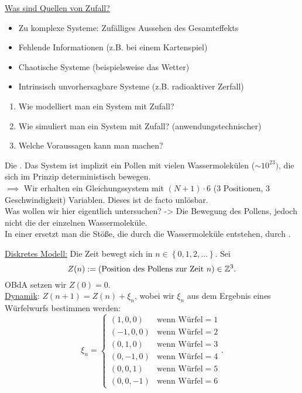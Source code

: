\underline{Was sind Quellen von Zufall?}
\begin{itemize}
    \item Zu komplexe Systeme: Zufälliges Aussehen des Gesamteffekts
    \item Fehlende Informationen (z.B. bei einem Kartenspiel)
    \item Chaotische Systeme (beispielsweise das Wetter)
    \item Intrinsisch unvorhersagbare Systeme (z.B. radioaktiver Zerfall)
\end{itemize}
\begin{question}
    \begin{enumerate}[(1)]
        \item Wie modelliert man ein System mit Zufall?
        \item Wie simuliert man ein System mit Zufall? (anwendungstechnischer)
        \item Welche Voraussagen kann man machen?
    \end{enumerate}
\end{question}


\begin{example}
    Die . Das System ist implizit ein Pollen mit vielen Wassermolekülen ($\sim 10^{23})$, die sich im Prinzip deterministisch bewegen. \\
    $\implies$ Wir erhalten ein Gleichungssystem mit $(N+1)\cdot 6$ (3 Positionen, 3 Geschwindigkeit) Variablen. Dieses ist de facto unlösbar. \\

    Was wollen wir hier eigentlich untersuchen? -> Die Bewegung des Pollens, jedoch nicht die der einzelnen Wassermoleküle. \\
    In einer  ersetzt man die Stöße, die durch die Wassermoleküle entstehen, durch . 
\end{example}

\underline{Diskretes Modell:} Die Zeit bewegt sich in $n\in \left \{0,1,2,\ldots\right\} $. Sei
\[
    Z(n) := (\text{Position des Pollens zur Zeit $n$}) \in  \mathbb{Z}^3
.\] 
OBdA setzen wir $Z(0) = 0$. \\
\underline{Dynamik}: $Z(n+1) = Z(n) + \xi_n$, wobei wir $\xi_n$ aus dem Ergebnis eines Würfelwurfs bestimmen werden:
 \[
\xi_n = \begin{cases}
    (1,0,0) & \text{wenn Würfel}=1 \\
    (-1,0,0) & \text{wenn Würfel}=2 \\
    (0,1,0) & \text{wenn Würfel}=3 \\
    (0,-1,0) & \text{wenn Würfel}=4 \\
    (0,0,1) & \text{wenn Würfel}=5 \\
    (0,0,-1) & \text{wenn Würfel}=6
\end{cases}
.\] 


